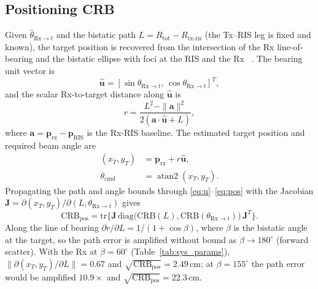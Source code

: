 \documentclass[journal]{IEEEtran}
\begin{document}
\subsection{Positioning CRB}
Given $\hat{\theta}_{\mathrm{Rx}\to t}$ and the bistatic path $L = R_{\mathrm{tot}} - R_{\mathrm{tx\text{-}ris}}$ (the Tx--RIS leg is fixed and known), the target position is recovered from the intersection of the Rx line-of-bearing and the bistatic ellipse with foci at the RIS and the Rx
~\cite{willis2005bistatic, willis2007advances}. The
bearing unit vector is
\begin{equation}
\hat{\bm{u}} = [\sin\theta_{\mathrm{Rx}\to t},\,
\cos\theta_{\mathrm{Rx}\to t}]^T,
\label{eq:u}
\end{equation}
and the scalar Rx-to-target distance along $\hat{\bm{u}}$ is
\begin{equation}
r = \frac{L^2 - \|\bm{a}\|^2}{2(\bm{a}\!\cdot\!\hat{\bm{u}} + L)},
\label{eq:r}
\end{equation}
where $\bm{a} = \bm{p}_{\mathrm{rx}} - \bm{p}_{\mathrm{RIS}}$ is the Rx-RIS
baseline. The estimated target position and required beam angle are
\begin{align}
(x_T, y_T) &= \bm{p}_{\mathrm{rx}} + r\hat{\bm{u}},
\label{eq:pos}\\
\theta_{\mathrm{cmd}} &= \operatorname{atan2}(x_T, y_T).
\label{eq:theta2}
\end{align}
Propagating the path and angle bounds through \eqref{eq:u}--\eqref{eq:pos} with the Jacobian $\bm{J} = \partial(x_T,y_T)/\partial(L,\theta_{\mathrm{Rx}\to t})$ gives~\cite{steven1993fundamentals}
\begin{equation}
\mathrm{CRB}_{\mathrm{pos}} = \mathrm{tr}\big\{\bm{J}\,\mathrm{diag}\big(\mathrm{CRB}(L),\mathrm{CRB}(\theta_{\mathrm{Rx}\to t})\big)\,\bm{J}^T\big\}.
\label{eq:crb_pos}
\end{equation}
Along the line of bearing $\partial r/\partial L = 1/(1+\cos\beta)$, where $\beta$ is the bistatic angle at the target, so the path error is amplified without bound as $\beta \to 180^\circ$ (forward scatter). With the Rx at $\beta = 60^\circ$ (Table~\ref{tab:sys_params}), $\|\partial(x_T,y_T)/\partial L\| = 0.67$ and $\sqrt{\mathrm{CRB}_{\mathrm{pos}}} = 2.49$\,cm; at $\beta = 155^\circ$ the path error would be amplified $10.9\times$ and $\sqrt{\mathrm{CRB}_{\mathrm{pos}}} = 22.3$\,cm.
\end{document}
